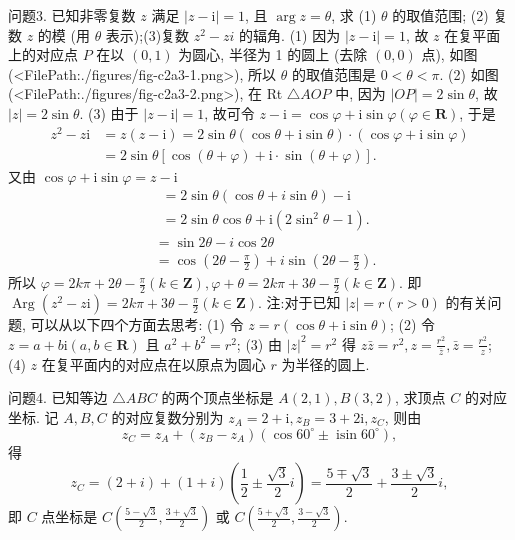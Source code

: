 问题3. 已知非零复数 $z$ 满足 $|z-\mathrm{i}|=1$, 且 $\arg z=\theta$, 求
(1) $\theta$ 的取值范围; (2) 复数 $z$ 的模 (用 $\theta$ 表示);(3)复数 $z^2-z i$ 的辐角.
(1) 因为 $|z-\mathrm{i}|=1$, 故 $z$ 在复平面上的对应点 $P$ 在以 $(0,1)$ 为圆心, 半径为 1 的圆上 (去除 $(0,0)$ 点), 如图(<FilePath:./figures/fig-c2a3-1.png>), 所以 $\theta$ 的取值范围是 $0< \theta<\pi$.
(2) 如图(<FilePath:./figures/fig-c2a3-2.png>), 在 Rt $\triangle A O P$ 中, 因为 $|O P|=2 \sin \theta$, 故 $|z|=2 \sin \theta$.
(3) 由于 $|z-\mathrm{i}|=1$, 故可令 $z-\mathrm{i}=\cos \varphi+\mathrm{i} \sin \varphi(\varphi \in \mathbf{R})$, 于是
$$
\begin{aligned}
z^2-z \mathrm{i} & =z(z-\mathrm{i})=2 \sin \theta(\cos \theta+\mathrm{i} \sin \theta) \cdot(\cos \varphi+\mathrm{i} \sin \varphi) \\
& =2 \sin \theta[\cos (\theta+\varphi)+\mathrm{i} \cdot \sin (\theta+\varphi)] .
\end{aligned}
$$
又由 $\cos \varphi+\mathrm{i} \sin \varphi=z-\mathrm{i}$
$$
\begin{aligned}
& =2 \sin \theta(\cos \theta+i \sin \theta)-\mathrm{i} \\
& =2 \sin \theta \cos \theta+\mathrm{i}\left(2 \sin ^2 \theta-1\right) .
\end{aligned}
$$
$$
\begin{aligned}
& =\sin 2 \theta-i \cos 2 \theta \\
& =\cos \left(2 \theta-\frac{\pi}{2}\right)+i \sin \left(2 \theta-\frac{\pi}{2}\right) .
\end{aligned}
$$
所以 $\varphi=2 k \pi+2 \theta-\frac{\pi}{2}(k \in \mathbf{Z}), \varphi+\theta=2 k \pi+3 \theta-\frac{\pi}{2}(k \in \mathbf{Z})$.
即 $\operatorname{Arg}\left(z^2-z \mathrm{i}\right)=2 k \pi+3 \theta-\frac{\pi}{2}(k \in \mathbf{Z})$.
注:对于已知 $|z|=r(r>0)$ 的有关问题, 可以从以下四个方面去思考:
(1) 令 $z=r(\cos \theta+\mathrm{i} \sin \theta)$;
(2) 令 $z=a+b \mathrm{i}(a, b \in \mathbf{R})$ 且 $a^2+b^2=r^2$;
(3) 由 $|z|^2=r^2$ 得 $z \bar{z}=r^2, z=\frac{r^2}{\bar{z}}, \bar{z}=\frac{r^2}{z}$;
(4) $z$ 在复平面内的对应点在以原点为圆心 $r$ 为半径的圆上.



问题4. 已知等边 $\triangle A B C$ 的两个顶点坐标是 $A(2,1), B(3,2)$, 求顶点 $C$ 的对应坐标.
记 $A, B, C$ 的对应复数分别为 $z_A=2+\mathrm{i}, z_B=3+2 \mathrm{i}, z_C$, 则由
$$
z_C=z_A+\left(z_B-z_A\right)\left(\cos 60^{\circ} \pm \operatorname{isin} 60^{\circ}\right),
$$
得
$$
z_C=(2+i)+(1+i)\left(\frac{1}{2} \pm \frac{\sqrt{3}}{2} i\right)=\frac{5 \mp \sqrt{3}}{2}+\frac{3 \pm \sqrt{3}}{2} i,
$$
即 $C$ 点坐标是 $C\left(\frac{5-\sqrt{3}}{2}, \frac{3+\sqrt{3}}{2}\right)$ 或 $C\left(\frac{5+\sqrt{3}}{2}, \frac{3-\sqrt{3}}{2}\right)$.



